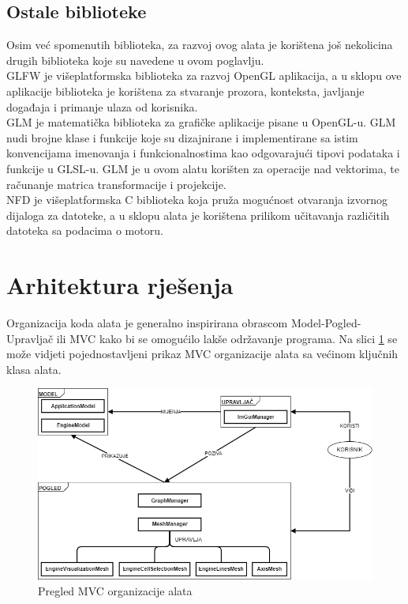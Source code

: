 \documentclass[times, utf8, diplomski]{fer}
\begin{document}
\subsection{Ostale biblioteke}
Osim već spomenutih biblioteka, za razvoj ovog alata je korištena još nekolicina drugih biblioteka koje su navedene u ovom poglavlju.\\

GLFW\citep{glfw} je višeplatformska biblioteka za razvoj OpenGL aplikacija, a u sklopu ove aplikacije biblioteka je korištena za stvaranje prozora, konteksta, javljanje događaja i primanje ulaza od korisnika.\\

GLM\citep{glm} je matematička biblioteka za grafičke aplikacije pisane u OpenGL-u. GLM nudi brojne klase i funkcije koje su dizajnirane i implementirane sa istim konvencijama imenovanja i funkcionalnostima kao odgovarajući tipovi podataka i funkcije u GLSL-u. GLM je u ovom alatu korišten za operacije nad vektorima, te računanje matrica transformacije i projekcije.\\

NFD\citep{nfd}  je višeplatformska C biblioteka koja pruža mogućnost otvaranja izvornog dijaloga za datoteke, a u sklopu alata je korištena prilikom učitavanja različitih datoteka sa podacima o motoru.

\section{Arhitektura rješenja} \label{codebase-architecture-section}

Organizacija koda alata je generalno inspirirana obrascom Model-Pogled-Upravljač ili MVC  kako bi se omogućilo lakše održavanje programa. Na slici \ref{fig:high-level-overview} se može vidjeti pojednostavljeni prikaz MVC organizacije alata sa većinom ključnih klasa alata.

\begin{figure} [H]
	\centering
    \includegraphics[width=\textwidth]{high_level_overview.png}
    \caption{Pregled MVC organizacije alata}
    \label{fig:high-level-overview}
\end{figure}
\ 
\\
\end{document}
